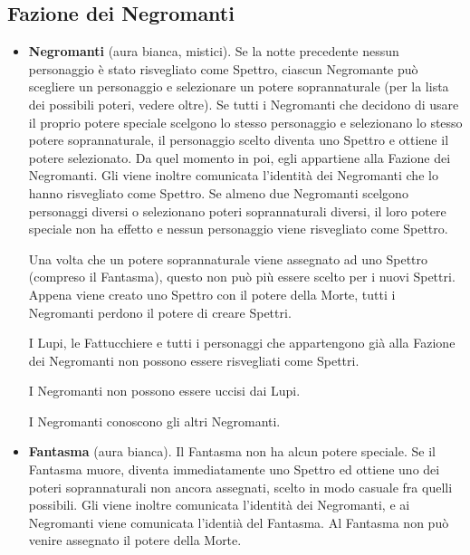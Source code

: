 \documentclass[a4paper,10pt]{article}
\begin{document}
\subsection*{Fazione dei Negromanti}
\label{spettri}
\begin{itemize}

 \item {\bf Negromanti} (aura bianca, mistici). %
 Se la notte precedente nessun personaggio è stato risvegliato come Spettro, ciascun Negromante può scegliere un personaggio e selezionare un potere soprannaturale (per la lista dei possibili poteri, vedere oltre).
 Se tutti i Negromanti che decidono di usare il proprio potere speciale scelgono lo stesso personaggio e selezionano lo stesso potere soprannaturale, il personaggio scelto diventa uno Spettro e ottiene il potere selezionato.
 Da quel momento in poi, egli appartiene alla Fazione dei Negromanti. Gli viene inoltre comunicata l'identità dei Negromanti che lo hanno risvegliato come Spettro.
 Se almeno due Negromanti scelgono personaggi diversi o selezionano poteri soprannaturali diversi, il loro potere speciale non ha effetto e nessun personaggio viene risvegliato come Spettro.
 
 Una volta che un potere soprannaturale viene assegnato ad uno Spettro (compreso il Fantasma), questo non può più essere scelto per i nuovi Spettri. Appena viene creato uno Spettro con il potere della Morte, tutti i Negromanti perdono il potere di creare Spettri.
 
 I Lupi, le Fattucchiere e tutti i personaggi che appartengono già alla Fazione dei Negromanti non possono essere risvegliati come Spettri. %

 I Negromanti non possono essere uccisi dai Lupi.

 I Negromanti conoscono gli altri Negromanti.
 
 \item {\bf Fantasma} (aura bianca). Il Fantasma non ha alcun potere speciale. Se il Fantasma muore, diventa immediatamente uno Spettro ed ottiene uno dei poteri soprannaturali non ancora assegnati, scelto in modo casuale fra quelli possibili. Gli viene inoltre comunicata l'identità dei Negromanti, e ai Negromanti viene comunicata l'identià del Fantasma.
 Al Fantasma non può venire assegnato il potere della Morte.
 

\end{itemize}
\end{document}

